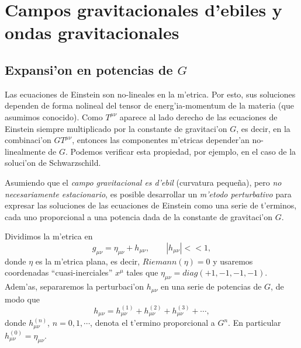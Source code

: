 \chapter{Campos gravitacionales d'ebiles y ondas gravitacionales}\label{capdebil1}

\section{Expansi'on en potencias de \texorpdfstring{$G$}{G}}
Las ecuaciones de Einstein son no-lineales en la m'etrica. Por esto, sus
soluciones dependen de forma nolineal del tensor de energ'ia-momentum de la
materia (que asumimos conocido). Como $T^{\mu\nu}$ aparece al lado derecho de las ecuaciones de Einstein siempre multiplicado por la constante de gravitaci'on $G$, es decir, en la combinaci'on $GT^{\mu\nu}$, entonces las componentes m'etricas depender'an no-linealmente de $G$. Podemos verificar esta propiedad, por ejemplo, en el caso de la soluci'on de Schwarzschild.

Asumiendo que el \textit{campo gravitacional es d'ebil} (curvatura peque\~na), pero \textit{no necesariamente estacionario}, es posible desarrollar un \textit{m'etodo perturbativo}
para expresar las soluciones de las ecuaciones de Einstein como una serie de
t'erminos, cada uno proporcional a una potencia dada de la constante de gravitaci'on $G$.


Dividimos la m'etrica en
\begin{equation} \label{exp01}
g_{\mu\nu}=\eta_{\mu\nu}+h_{\mu\nu}, \qquad \left|h_{\mu\nu}\right|<< 1,
\end{equation}
donde $\eta$ es la m'etrica plana, es decir, $Riemann(\eta)=0$ y usaremos
coordenadas ``cuasi-inerciales'' $x^\mu$ tales
que $\eta_{\mu\nu}=diag(+1,-1,-1,-1)$. Adem'as, separaremos la perturbaci'on $h_{\mu\nu}$ en una serie de potencias de $G$, de modo que
\begin{equation}
h_{\mu\nu}=h^{(1)}_{\mu\nu}+h^{(2)}_{\mu\nu}+h^{(3)}_{\mu\nu}+\cdots,
\end{equation}
donde $h^{(n)}_{\mu\nu}$, $n=0,1,\cdots$, denota el t'ermino proporcional a $G^n$. En particular $h^{(0)}_{\mu\nu}=\eta_{\mu\nu}$.


